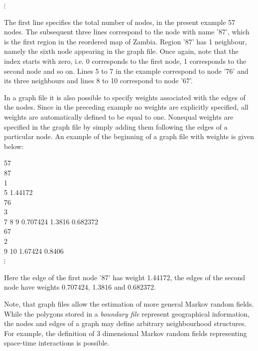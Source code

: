\documentclass{article}
\begin{document}
\hspace{1cm} $\vdots$

\normalsize

\vspace{0.5cm}

The first line specifies the total number of nodes, in the present
example 57 nodes. The subsequent three lines correspond to the
node with name '87', which is the first region in the reordered
map of Zambia. Region '87' has 1 neighbour, namely the sixth node
appearing in the graph file. Once again, note that the index
starts with zero, i.e. 0 corresponds to the first node, 1
corresponds to the second node and so on. Lines 5 to 7 in the
example correspond to node '76' and its three neighbours and lines
8 to 10 correspond to node '67'.

In a graph file it is also possible to specify weights associated
with the edges of the nodes. Since in the preceding example no
weights are explicitly specified, all weights are automatically
defined to be equal to one. Nonequal weights are specified in the
graph file by simply adding them following the edges of a
particular node.
An example of the beginning of a graph file with weights is given below: \\

\footnotesize

 57\\
 87\\
 1\\
 5 1.44172\\
 76\\
 3\\
 7 8 9 0.707424 1.3816 0.682372\\
 67\\
 2\\
 9 10 1.67424 0.8406\\

\hspace{1cm} $\vdots$

\normalsize

\vspace{0.5cm}

Here the edge of the first node '87' has weight 1.44172, the edges
of the second node have weights 0.707424, 1.3816 and 0.682372.

Note, that graph files allow the estimation of more general Markov
random fields. While the polygons stored in a {\em boundary file}
represent geographical information, the nodes and edges of a graph
may define arbitrary neighbourhood structures. For example, the
definition of 3 dimensional Markov random fields representing
space-time interactions is possible.
\end{document}
